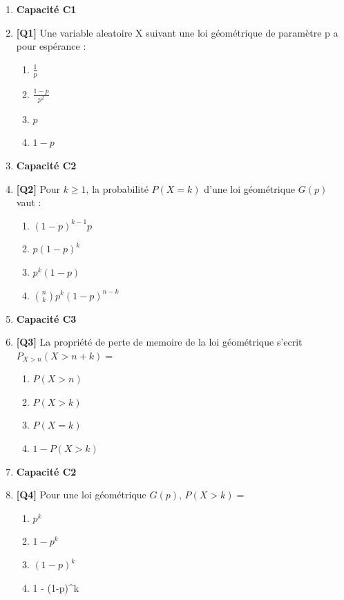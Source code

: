 \begin{enumerate}

\item[] \textbf{Capacité C1}

\item \textbf{[Q1]} Une variable aleatoire X suivant une loi géométrique de paramètre p a pour espérance :
  \begin{enumerate}[label=\Alph*.]
    \item $\frac{1}{p}$
    \item $\frac{1-p}{p^2}$
    \item $p$
    \item $1-p$
  \end{enumerate}

\item[] \textbf{Capacité C2}

\item \textbf{[Q2]} Pour $k \ge 1$, la probabilité $P(X = k)$ d'une loi géométrique $G(p)$ vaut :
  \begin{enumerate}[label=\Alph*.]
    \item $(1-p)^{k-1} p$
    \item $p (1-p)^k$
    \item $p^k (1-p)$
    \item $\binom{n}{k} p^k (1-p)^{n-k}$
  \end{enumerate}

\item[] \textbf{Capacité C3}

\item \textbf{[Q3]} La propriété de perte de memoire de la loi géométrique s'ecrit $P_{X > n}(X > n+k) =$
  \begin{enumerate}[label=\Alph*.]
    \item $P(X > n)$
    \item $P(X > k)$
    \item $P(X = k)$
    \item $1 - P(X > k)$
  \end{enumerate}

\item[] \textbf{Capacité C2}

\item \textbf{[Q4]} Pour une loi géométrique $G(p)$, $P(X > k) =$
  \begin{enumerate}[label=\Alph*.]
    \item $p^k$
    \item $1 - p^k$
    \item $(1-p)^k$
    \item 1 - (1-p)\textasciicircum{}k
  \end{enumerate}


\end{enumerate}
